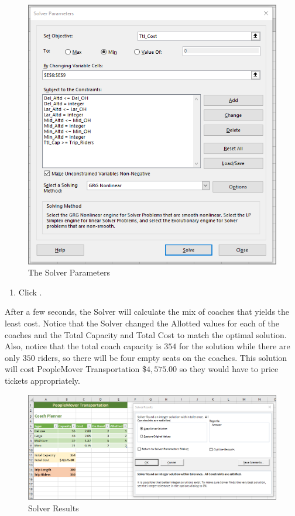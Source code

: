 \begin{figure}[H]
	\centering
	\includegraphics[width=\maxwidth{.95\linewidth}]{gfx/ch08_fig38}
	\caption{The Solver Parameters}
	\label{08:fig38}
\end{figure}

\begin{enumerate}[resume]	 
	 \item Click .
\end{enumerate}

After a few seconds, the Solver will calculate the mix of coaches that yields the least cost. Notice that the Solver changed the Allotted values for each of the coaches and the Total Capacity and Total Cost to match the optimal solution. Also, notice that the total coach capacity is $ 354 $ for the solution while there are only $ 350 $ riders, so there will be four empty seats on the coaches. This solution will cost PeopleMover Transportation \$$ 4,575.00 $ so they would have to price tickets appropriately.

\begin{figure}[H]
	\centering
	\includegraphics[width=\maxwidth{.95\linewidth}]{gfx/ch08_fig39}
	\caption{Solver Results}
	\label{08:fig39}
\end{figure}

